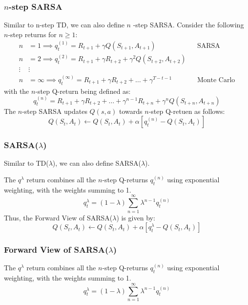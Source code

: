 \subsubsection{\(n\)-step SARSA}
Similar to n-step TD, we can also define \(n\) -step SARSA. Consider the following \(n\)-step
returns for \(n \geq 1\):
\[
  \begin{aligned}
    n &= 1 \implies q_t^{(1)} = R_{t+1} + \gamma Q(S_{t+1}, A_{t+1}) && \text{SARSA} \\
    n &= 2 \implies q_t^{(2)} = R_{t+1} + \gamma R_{t+2} + \gamma^2 Q(S_{t+2}, A_{t+2}) \\
    \vdots & \vdots \\
    n &= \infty \implies q_t^{(\infty)} = R_{t+1} + \gamma R_{t+2} + \dots + \gamma^{T-t-1}
    && \text{Monte Carlo}
  \end{aligned}
\]
with the \(n\)-step Q-return being defined as:
\[
  q_t^{(n)} = R_{t+1} + \gamma R_{t+2} + \dots + \gamma^{n-1} R_{t+n} + \gamma^n Q(S_{t+n},
  A_{t+n})
\]
The \(n\)-step SARSA updates \(Q(s,a)\) towards \(n\)-step Q-retuen as follows:
\[
  Q(S_t, A_t) \leftarrow Q(S_t, A_t) + \alpha \left[ 
    q_t^{(n)} - Q(S_t, A_t)
  \right]
\]
\subsubsection{SARSA(\(\lambda\))}
Similar to TD(\(\lambda\)), we can also define SARSA(\(\lambda\)). 

The \(q^\lambda\) return combines all the \(n\)-step Q-returns \(q_t^{(n)}\) using 
exponential weighting, with the weights summing to 1.
\[
  q_t^\lambda = (1-\lambda) \sum_{n=1}^{\infty} \lambda^{n-1} q_t^{(n)}
\]  
Thus, the Forward View of SARSA(\(\lambda\)) is given by:
\[
  Q(S_t, A_t) \leftarrow Q(S_t, A_t) + \alpha \left[ 
    q_t^\lambda - Q(S_t, A_t)
  \right]
\]
\subsubsection*{Forward View of SARSA(\(\lambda\))}
The \(q^\lambda\) return combines all the \(n\)-step Q-returns \(q_t^{(n)}\) using 
exponential weighting, with the weights summing to 1.
\[
  q_t^\lambda = (1-\lambda) \sum_{n=1}^{\infty} \lambda^{n-1} q_t^{(n)}
\] 

